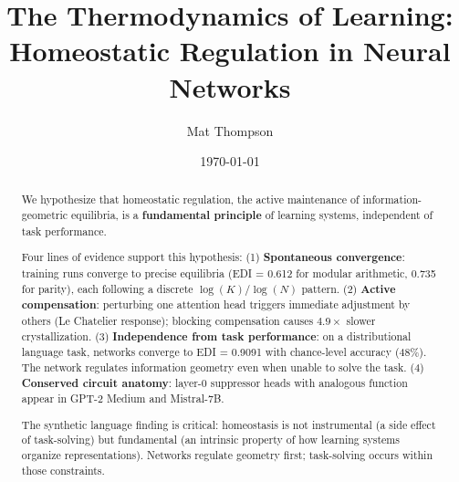 \documentclass{article}
\title{\textbf{The Thermodynamics of Learning:}\\ Homeostatic Regulation in Neural Networks}
\author{Mat Thompson}
\date{\today}
\begin{document}
\maketitle

\begin{abstract}
We hypothesize that homeostatic regulation, the active maintenance of information-geometric equilibria, is a \textbf{fundamental principle} of learning systems, independent of task performance.

Four lines of evidence support this hypothesis: (1) \textbf{Spontaneous convergence}: training runs converge to precise equilibria (EDI = 0.612 for modular arithmetic, 0.735 for parity), each following a discrete $\log(K)/\log(N)$ pattern. (2) \textbf{Active compensation}: perturbing one attention head triggers immediate adjustment by others (Le Chatelier response); blocking compensation causes $4.9\times$ slower crystallization. (3) \textbf{Independence from task performance}: on a distributional language task, networks converge to EDI = 0.9091 with chance-level accuracy (48\%). The network regulates information geometry even when unable to solve the task. (4) \textbf{Conserved circuit anatomy}: layer-0 suppressor heads with analogous function appear in GPT-2 Medium and Mistral-7B.

The synthetic language finding is critical: homeostasis is not instrumental (a side effect of task-solving) but fundamental (an intrinsic property of how learning systems organize representations). Networks regulate geometry first; task-solving occurs within those constraints.
\end{abstract}














\end{document}

